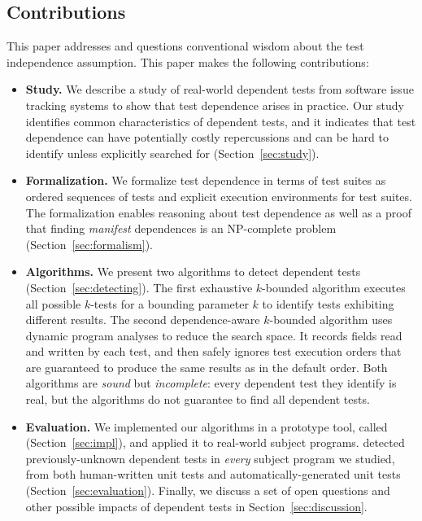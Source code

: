 \subsection{Contributions}
\label{sec:contributions}

This paper addresses and questions
conventional wisdom about the test independence assumption. 
This paper makes the following contributions:

\begin{itemize}

  \item \textbf{Study.} We describe a study of \dtnum real-world
  dependent tests from \repnum software issue tracking
  systems to show that test dependence
  arises in practice. Our study identifies common
  characteristics of dependent tests, and
  it indicates that test dependence can have
  potentially costly repercussions and can be hard to identify unless
  explicitly searched for (Section~\ref{sec:study}).

\item \textbf{Formalization.} We formalize test dependence
  in terms of test suites as ordered sequences of tests and explicit execution
  environments for test suites.  The formalization enables reasoning about test dependence
  as well as a proof that finding \emph{manifest} dependences is an NP-complete
  problem (Section~\ref{sec:formalism}).

  \item \textbf{Algorithms.} We present two algorithms
  to detect dependent tests (Section~\ref{sec:detecting}).
  The first exhaustive $k$-bounded algorithm
  executes all possible $k$-tests for
  a bounding parameter $k$ to identify tests exhibiting different results.
  The second dependence-aware $k$-bounded
  algorithm uses dynamic program analyses
  to reduce the search space. It records fields read and
  written by each test, and then safely ignores test execution orders
  that are guaranteed to produce the same results as in the default
  order. Both algorithms are \emph{sound} but \emph{incomplete}:
  every dependent test they identify is real, but the algorithms
  do not guarantee to find all dependent tests. 

  \item \textbf{Evaluation.} We implemented our algorithms in a prototype
  tool, called \ourtool (Section~\ref{sec:impl}), and applied it to \subjnum real-world subject programs.
  \ourtool detected previously-unknown dependent tests in \textit{every}
  subject program we studied, from both human-written unit tests and automatically-generated
  unit tests (Section~\ref{sec:evaluation}).
  Finally, we discuss a set of open questions and other possible impacts of dependent
  tests in Section~\ref{sec:discussion}.
\end{itemize}



